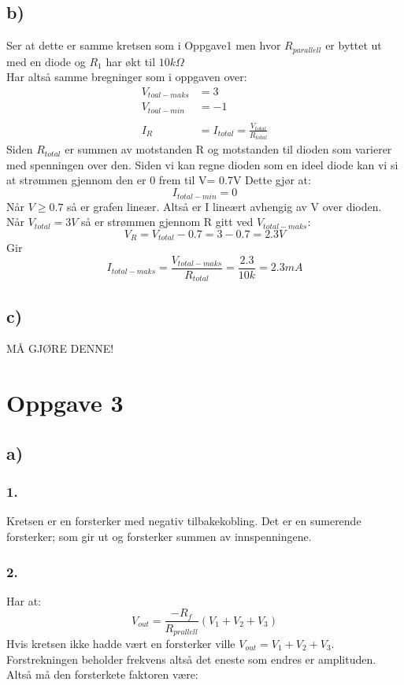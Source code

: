 \documentclass[a4paper, norsk, twoside, 10pt]{article}
\begin{document}
\subsection*{b)}
Ser at dette er samme kretsen som i Oppgave1 men hvor $R_{parallell}$ er byttet ut med en diode og $R_{1}$ har økt til $10k \Omega$ \\
Har altså samme bregninger som i oppgaven over:
\begin{align*}
  V_{toal-maks} &= 3\\
  V_{toal-min} &= -1\\
  \\
  I_{R} &= I_{total} = \frac{V_{total}}{R_{total}}
\end{align*}
Siden $R_{total}$ er summen av motstanden R og motstanden til dioden som varierer med spenningen over den. Siden vi kan regne dioden som en ideel diode kan vi si at strømmen gjennom den er 0 frem til V= 0.7V Dette gjør at:
\[I_{total-min} = 0 \]
Når $V \geq 0.7$ så er grafen lineær. Altså er I lineært avhengig av V over dioden. Når $V_{total} = 3V$ så er strømmen gjennom R gitt ved $V_{total-maks}$:
\[V_{R} = V_{total} - 0.7 = 3-0.7 = 2.3V\]
Gir
\[I_{total-maks} =  \frac{V_{total-maks}}{R_{total}} = \frac{2.3}{10k} = 2.3mA\]





\subsection*{c)}

MÅ GJØRE DENNE!




\newpage

\section*{Oppgave 3}
\subsection*{a)}
\subsubsection*{1.}
Kretsen er en forsterker med negativ tilbakekobling. Det er en sumerende forsterker; som gir ut og forsterker summen av innspenningene. 



\subsubsection*{2.}
Har at:
\[V_{out} = \frac{-R_{f}}{R_{prallell}} (V_{1} + V_{2} + V_{3})\]
Hvis kretsen ikke hadde vært en forsterker ville $V_{out} = V_{1} + V_{2} + V_{3}$. Forstrekningen beholder frekvens altså det eneste som endres er amplituden. Altså må den forsterkete faktoren være:
\end{document}
